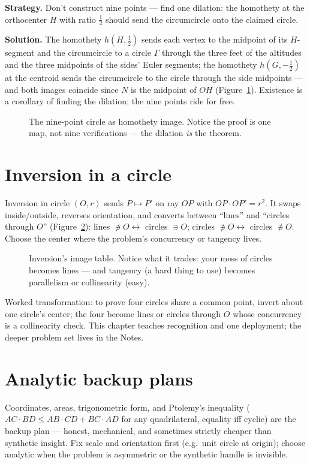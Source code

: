 \begin{example}
\textbf{Strategy.} Don't construct nine points --- find one dilation:
the homothety at the orthocenter $H$ with ratio $\tfrac12$ should send
the circumcircle onto the claimed circle.

\textbf{Solution.} The homothety $h(H,\tfrac12)$ sends each vertex to
the midpoint of its $H$-segment and the circumcircle to a circle
$\Gamma$ through the three feet of the altitudes and the three
midpoints of the sides' Euler segments; the homothety $h(G,-\tfrac12)$
at the centroid sends the circumcircle to the circle through the side
midpoints --- and both images coincide since $N$ is the midpoint of
$OH$ (Figure~\ref{fig:ninept}). Existence is a corollary of finding the
dilation; the nine points ride for free.
\end{example}
\begin{figure}[ht]\centering

\caption{The nine-point circle as homothety image. Notice the proof is
one map, not nine verifications --- the dilation \emph{is} the theorem.}
\label{fig:ninept}
\end{figure}

\section{Inversion in a circle}
Inversion in circle $(O,r)$ sends $P\mapsto P'$ on ray $OP$ with
$OP\cdot OP' = r^2$. It swaps inside/outside, reverses orientation, and
converts between ``lines'' and ``circles through $O$''
(Figure~\ref{fig:invert}): lines $\not\ni O \leftrightarrow$ circles
$\ni O$; circles $\not\ni O \leftrightarrow$ circles $\not\ni O$.
Choose the center where the problem's concurrency or tangency lives.
\begin{figure}[ht]\centering

\caption{Inversion's image table. Notice what it trades: your mess of
circles becomes lines --- and tangency (a hard thing to use) becomes
parallelism or collinearity (easy).}
\label{fig:invert}
\end{figure}
Worked transformation: to prove four circles share a common point,
invert about one circle's center; the four become lines or circles
through $O$ whose concurrency is a collinearity check. This chapter
teaches recognition and one deployment; the deeper problem set lives in
the Notes.

\section{Analytic backup plans}
Coordinates, areas, trigonometric form, and Ptolemy's inequality
($AC\cdot BD \le AB\cdot CD + BC\cdot AD$ for any quadrilateral,
equality iff cyclic) are the backup plan --- honest, mechanical, and
sometimes strictly cheaper than synthetic insight. Fix scale and
orientation first (e.g.\ unit circle at origin); choose analytic when
the problem is asymmetric or the synthetic handle is invisible.

